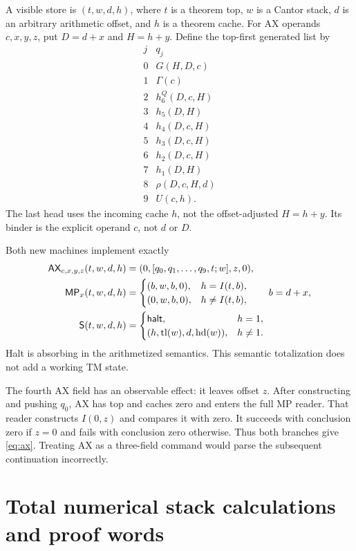 A visible store is $(t,w,d,h)$, where $t$ is a theorem top, $w$ is a
Cantor stack, $d$ is an arbitrary arithmetic offset, and $h$ is a theorem
cache. For AX operands $c,x,y,z$, put
$D=d+x$ and $H=h+y$. Define the top-first generated list by
\[
\begin{array}{c|l}
j&q_j\\\hline
0&G(H,D,c)\\
1&\Gamma(c)\\
2&h_6^Q(D,c,H)\\
3&h_5(D,H)\\
4&h_4(D,c,H)\\
5&h_3(D,c,H)\\
6&h_2(D,c,H)\\
7&h_1(D,H)\\
8&\rho(D,c,H,d)\\
9&U(c,h).
\end{array}
\]
The last head uses the incoming cache $h$, not the offset-adjusted
$H=h+y$. Its binder is the explicit operand $c$, not $d$ or $D$.

Both new machines implement exactly
\begin{align}
 \mathsf{AX}_{c,x,y,z}(t,w,d,h)
   &=(0,[q_0,q_1,\ldots,q_9,t;w],z,0),\label{eq:ax}\\
 \mathsf{MP}_x(t,w,d,h)
   &=\begin{cases}
      (b,w,b,0),&h=I(t,b),\\
      (0,w,b,0),&h\ne I(t,b),
     \end{cases}\qquad b=d+x,\label{eq:mp}\\
 \mathsf{S}(t,w,d,h)
   &=\begin{cases}
      \mathsf{halt},&h=1,\\
      (h,\operatorname{tl}(w),d,\operatorname{hd}(w)),&h\ne1.
     \end{cases}\label{eq:shift}
\end{align}
Halt is absorbing in the arithmetized semantics. This semantic
totalization does not add a working TM state.

The fourth AX field has an observable effect: it leaves offset $z$.
After constructing and pushing $q_0$, AX has top and caches zero and
enters the full MP reader. That reader constructs $I(0,z)$ and compares
it with zero. It succeeds with conclusion zero if $z=0$ and fails with
conclusion zero otherwise. Thus both branches give
\eqref{eq:ax}. Treating AX as a three-field command would parse the
subsequent continuation incorrectly.

\section{Total numerical stack calculations and proof words}
\label{sec:words}


